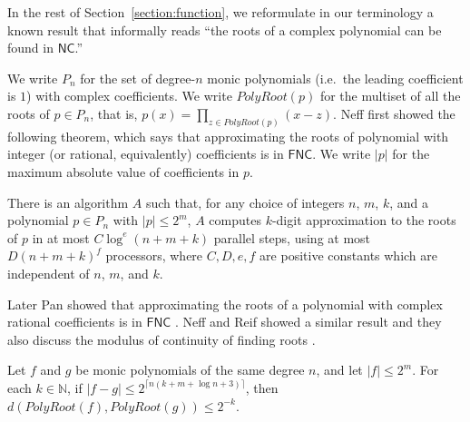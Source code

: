 \documentclass[envcountsect,envcountsame,orivec,oribibl]{llncs}
\newcommand{\N}{\mathbb N}
\newcommand{\classonefont}[1]{\mathsf{#1}}
\newcommand{\classNC}{\classonefont{NC}}
\newcommand{\classFNC}{\classonefont{FNC}}
\newcommand{\classtwofont}[1]{\text{\bfseries \sffamily \upshape #1}}
\newcommand{\classFNCtwo}{\classtwofont{FNC}}
\newcommand{\OpPolyRoot}{\mathit{PolyRoot}}
\begin{document}
In the rest of Section~\ref{section:function}, 
we reformulate in our terminology a known result that 
informally reads
``the roots of a complex polynomial can be found in $\classNC$.'' 

We write $P_n$ for the set of degree-$n$ monic 
polynomials (i.e.\ the leading coefficient is $1$) with complex coefficients.
We write $\OpPolyRoot(p)$ for the multiset of all the roots of $p \in P_n$, that is, $p(x) = \prod_{z \in \OpPolyRoot(p)} (x - z)$. 
Neff first showed the following theorem, which says that 
approximating the roots of polynomial
with integer (or rational, equivalently) coefficients is in $\classFNC$.
We write $|p|$ for the maximum absolute value of coefficients in $p$.

\begin{theorem}
\label{theorem:neff1994}
There is an algorithm $A$ such that,
for any choice of integers $n$, $m$, $k$, and a polynomial $p \in P_n$
with $|p| \le 2^m$,
$A$ computes $k$-digit approximation to the roots of $p$ 
in at most $C \log^e(n + m + k)$ parallel steps, 
using at most $D(n + m + k)^f$ processors, where $C, D, e, f$ are positive
constants which are independent of $n$, $m$, and $k$.
\end{theorem}

Later Pan showed that approximating the roots of a polynomial
with complex rational coefficients is in $\classFNC$ \cite{pan1995optimal}.
Neff and Reif showed a similar result and they also discuss
the modulus of continuity of finding roots \cite{neff1996efficient}.

\begin{theorem}
\label{neff1996modulus}
 Let $f$ and $g$ be monic polynomials of the same degree $n$,
 and let $|f| \le 2^m$.
 For each $k \in \N$, 
 if $|f - g| \le 2^{\lceil n(k + m + \log n + 3)\rceil}$, then
 $d(\OpPolyRoot(f), \OpPolyRoot(g)) \le 2^{-k}$. 
\end{theorem}

\end{document}
